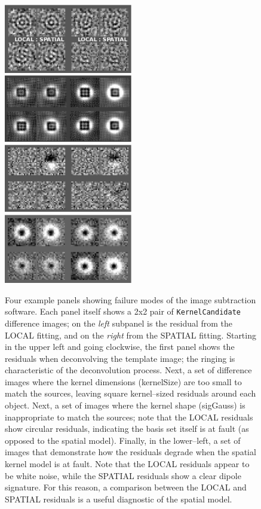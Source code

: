 \documentclass[prd, nofootinbib, floatfix, 11pt,tightenlines,times]{article}
\begin{document}
\begin{figure}
\includegraphics[width=0.5\textwidth, height=0.25\textwidth]{figures/deconv2.eps} 
\includegraphics[width=0.5\textwidth, height=0.25\textwidth]{figures/size2.eps} \\
\includegraphics[width=0.5\textwidth, height=0.25\textwidth]{figures/order2.eps} 
\includegraphics[width=0.5\textwidth, height=0.25\textwidth]{figures/shape2.eps} \\
\caption{Four example panels showing failure modes of the image
  subtraction software.  Each panel itself shows a 2x2 pair of
  {\tt KernelCandidate} difference images; on the {\it left} subpanel is the residual from
  the LOCAL fitting, and on the {\it right} from the SPATIAL fitting.
  Starting in the upper left and going clockwise, the first panel
  shows the residuals when deconvolving the template image; the
  ringing is characteristic of the deconvolution process.  Next, a set
  of difference images where the kernel dimensions (kernelSize) are
  too small to match the sources, leaving square kernel--sized
  residuals around each object.  Next, a set of images where the
  kernel shape (sigGauss) is inappropriate to match the sources; note
  that the LOCAL residuals show circular residuals, indicating the
  basis set itself is at fault (as opposed to the spatial model).
  Finally, in the lower--left, a set of images that demonstrate how
  the residuals degrade when the spatial kernel model is at fault.
  Note that the LOCAL residuals appear to be white noise, while the
  SPATIAL residuals show a clear dipole signature.  For this reason, a
  comparison between the LOCAL and SPATIAL residuals is a useful
  diagnostic of the spatial model.  }
\label{fig_galleryBad}
\end{figure}
\end{document}
